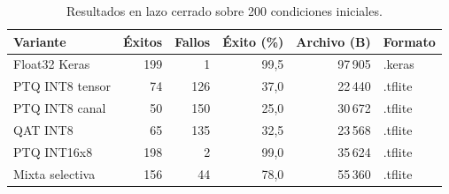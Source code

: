 \begin{table}[H]
\centering\small
\caption{Resultados en lazo cerrado sobre 200 condiciones iniciales.}\label{tab:mpcres}
\begin{tabularx}{\linewidth}{Yrrrrl}\toprule
Variante & Éxitos & Fallos & Éxito (\%) & Archivo (B) & Formato\\\midrule
Float32 Keras & 199 & 1 & 99,5 & 97\,905 & .keras\\
PTQ INT8 tensor & 74 & 126 & 37,0 & 22\,440 & .tflite\\
PTQ INT8 canal & 50 & 150 & 25,0 & 30\,672 & .tflite\\
QAT INT8 & 65 & 135 & 32,5 & 23\,568 & .tflite\\
PTQ INT16x8 & 198 & 2 & 99,0 & 35\,624 & .tflite\\
Mixta selectiva & 156 & 44 & 78,0 & 55\,360 & .tflite\\
\bottomrule\end{tabularx}
\end{table}
